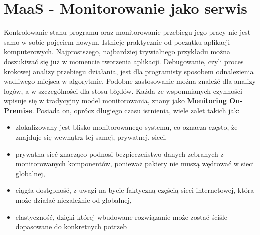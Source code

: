 \section{\textbf{MaaS} - Monitorowanie jako serwis}
\label{chapter:monitoring_architecture:maas}

Kontrolowanie stanu programu oraz monitorowanie przebiegu jego pracy nie jest samo w sobie pojęciem nowym. Istnieje praktycznie od początku 
aplikacji komputerowych. Najprostszego, najbardziej trywialnego przykładu można doszukiwać się już w momencie tworzenia aplikacji.
Debugowanie, czyli proces krokowej analizy przebiegu działania, jest dla programisty sposobem odnalezienia wadliwego miejsca w algorytmie.
Podobne zastosowanie można znaleźć dla analizy logów, a w szczególności dla stosu błędów. Każda ze wspomnianych czynności wpisuje się w tradycyjny model
monitorowania, znany jako \textbf{Monitoring On-Premise}. Posiada on, oprócz długiego czasu istnienia, wiele zalet takich jak:
\begin{itemize}
    \item zlokalizowany jest blisko monitorowanego systemu, co oznacza często, że znajduje się wewnątrz tej samej, prywatnej, sieci,
    \item prywatna sieć znacząco podnosi bezpieczeństwo danych zebranych z monitorowanych komponentów, ponieważ pakiety nie muszą
    wędrować w sieci globalnej,
    \item ciągła dostępność, z uwagi na bycie faktyczną częścią sieci internetowej, która może działać niezależnie od globalnej,
    \item elastyczność, dzięki której wbudowane rozwiązanie może zostać ściśle dopasowane do konkretnych potrzeb
\end{itemize}

